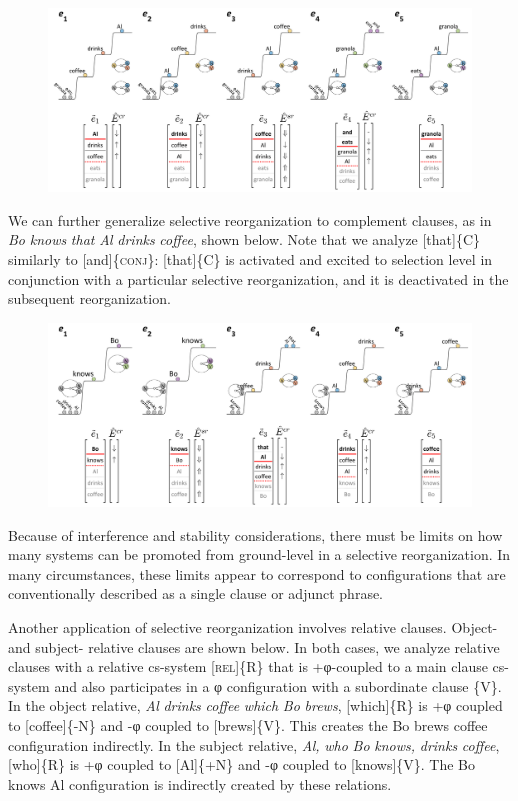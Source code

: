   
\begin{figure}
\includegraphics[width=\textwidth]{figures/Tilsen-img100.png}
\caption{\missingcaption}
\label{fig:}
\end{figure}
 

  We can further generalize selective reorganization to complement clauses, as in \textit{Bo} \textit{knows} \textit{that} \textit{Al} \textit{drinks} \textit{coffee}, shown below. Note that we analyze [that]\{C\} similarly to [and]\{\textsc{conj}\}: [that]\{C\} is activated and excited to selection level in conjunction with a particular selective reorganization, and it is deactivated in the subsequent reorganization. 

  
\begin{figure}
\includegraphics[width=\textwidth]{figures/Tilsen-img101.png}
\caption{\missingcaption}
\label{fig:}
\end{figure}
 

  Because of interference and stability considerations, there must be limits on how many systems can be promoted from ground-level in a selective reorganization. In many circumstances, these limits appear to correspond to configurations that are conventionally described as a single clause or adjunct phrase.

  Another application of selective reorganization involves relative clauses. Object- and subject- relative clauses are shown below. In both cases, we analyze relative clauses with a relative cs-system [\textsc{rel}]\{R\} that is +φ-coupled to a main clause cs-system and also participates in a φ configuration with a subordinate clause \{V\}. In the object relative, \textit{Al} \textit{drinks} \textit{coffee} \textit{which} \textit{Bo} \textit{brews}, [which]\{R\} is +φ coupled to [coffee]\{-N\} and -φ coupled to [brews]\{V\}. This creates the {\textbar}Bo brews coffee{\textbar} configuration indirectly. In the subject relative, \textit{Al,} \textit{who} \textit{Bo} \textit{knows,} \textit{drinks} \textit{coffee}, [who]\{R\} is +φ coupled to [Al]\{+N\} and -φ coupled to [knows]\{V\}. The {\textbar}Bo knows Al{\textbar} configuration is indirectly created by these relations.

